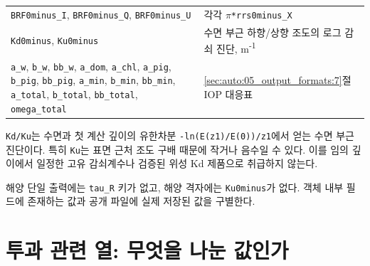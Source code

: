 {\begin{longtable}{@{}>{\raggedright\arraybackslash}p{}>{\raggedright\arraybackslash}p{}@{}}
\texttt{BRF0minus\_\allowbreak{}I}, \texttt{BRF0minus\_\allowbreak{}Q}, \texttt{BRF0minus\_\allowbreak{}U} & 각각 \texttt{\ensuremath{\pi}*rrs0minus\_\allowbreak{}X} \\
\texttt{Kd0minus}, \texttt{Ku0minus} & 수면 부근 하향/상향 조도의 로그 감쇠 진단, m\textsuperscript{-}\textsuperscript{1} \\
\texttt{a\_\allowbreak{}w}, \texttt{b\_\allowbreak{}w}, \texttt{bb\_\allowbreak{}w}, \texttt{a\_\allowbreak{}dom}, \texttt{a\_\allowbreak{}chl}, \texttt{a\_\allowbreak{}pig}, \texttt{b\_\allowbreak{}pig}, \texttt{bb\_\allowbreak{}pig}, \texttt{a\_\allowbreak{}min}, \texttt{b\_\allowbreak{}min}, \texttt{bb\_\allowbreak{}min}, \texttt{a\_\allowbreak{}total}, \texttt{b\_\allowbreak{}total}, \texttt{bb\_\allowbreak{}total}, \texttt{omega\_\allowbreak{}total} & \ref{sec:auto:05_output_formats:7}절 IOP 대응표 \\
\end{longtable}
}

\texttt{Kd/\allowbreak{}Ku}는 수면과 첫 계산 깊이의 유한차분 \texttt{-ln(E(z1)/\allowbreak{}E(0))/\allowbreak{}z1}에서 얻는 수면 부근 진단이다. 특히 \texttt{Ku}는 표면 근처 조도 구배 때문에 작거나 음수일 수 있다. 이를 임의 깊이에서 일정한 고유 감쇠계수나 검증된 위성 Kd 제품으로 취급하지 않는다.

해양 단일 출력에는 \texttt{tau\_\allowbreak{}R} 키가 없고, 해양 격자에는 \texttt{Ku0minus}가 없다. 객체 내부 필드에 존재하는 값과 공개 파일에 실제 저장된 값을 구별한다.

\section{투과 관련 열: 무엇을 나눈 값인가}
\label{sec:auto:05_output_formats:5}

